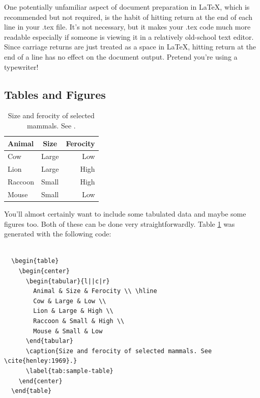 One potentially unfamiliar aspect of document preparation in \LaTeX, 
which is recommended but not required, is the habit of hitting return at the
end of each line in your .tex file. It's not necessary, but it makes your
.tex code much more readable especially if someone is viewing it in a 
relatively old-school text editor. Since carriage returns are just treated as
a space in \LaTeX, hitting return at the end of a line has no effect on the
document output. Pretend you're using a typewriter!

\subsection{Tables and Figures}

\begin{table}
  \begin{center}
    \begin{tabular}{l||c|r}
      Animal & Size & Ferocity \\ \hline
      Cow & Large & Low \\
      Lion & Large & High \\
      Raccoon & Small & High \\
      Mouse & Small & Low
    \end{tabular}
    \caption{Size and ferocity of selected mammals. See \cite{henley:1969}.}
    \label{tab:sample-table}
  \end{center}
\end{table}
      

You'll almost certainly want to include some tabulated data and maybe some
figures too. Both of these can be done very straightforwardly. Table
\ref{tab:sample-table} was generated with the following code:

\pagebreak

\begin{verbatim}

  \begin{table}
    \begin{center}
      \begin{tabular}{l||c|r}
        Animal & Size & Ferocity \\ \hline
        Cow & Large & Low \\
        Lion & Large & High \\
        Raccoon & Small & High \\
        Mouse & Small & Low
      \end{tabular}
      \caption{Size and ferocity of selected mammals. See \cite{henley:1969}.}
      \label{tab:sample-table}
    \end{center}
  \end{table}

\end{verbatim}

